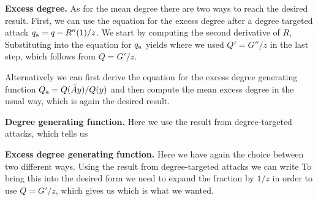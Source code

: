 {\bf Excess degree. } As for the mean degree there are two ways to reach the desired result. First, we can use the equation for the excess degree after a degree targeted attack $q_{\rm a}=q-R''(1)/z$. We start by computing the second derivative of $R$,
Substituting into the equation for $q_{\rm a}$ yields
where we used $Q'=G''/z$ in the last step, which follows from $Q=G'/z$. 

Alternatively we can first derive the equation for the excess degree generating function $Q_{\rm a}=Q(\tilde{A}y)/Q(y)$ and then compute the mean excess degree in the usual way,
which is again the desired result. 

{\bf Degree generating function.} Here we use the result from degree-targeted attacks, which tells us

{\bf Excess degree generating function.} Here we have again the choice between two different ways. Using the result from degree-targeted attacks we can write
To bring this into the desired form we need to expand the fraction by $1/z$ in order to use $Q=G'/z$, which gives us 
which is what we wanted. 

